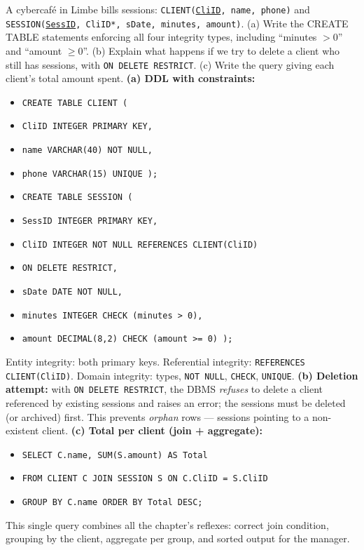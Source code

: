 \documentclass[11pt]{article}
\begin{document}
\begin{exoresolu}
A cybercafé in Limbe bills sessions: \texttt{CLIENT(\underline{CliID}, name, phone)} and \texttt{SESSION(\underline{SessID}, CliID*, sDate, minutes, amount)}. (a) Write the CREATE TABLE statements enforcing all four integrity types, including ``minutes $> 0$'' and ``amount $\geq 0$''. (b) Explain what happens if we try to delete a client who still has sessions, with \texttt{ON DELETE RESTRICT}. (c) Write the query giving each client's total amount spent.
\tcblower
\textbf{(a) DDL with constraints:}
\begin{itemize}
\item[] \texttt{CREATE TABLE CLIENT (}
\item[] \texttt{\quad CliID INTEGER PRIMARY KEY,}
\item[] \texttt{\quad name VARCHAR(40) NOT NULL,}
\item[] \texttt{\quad phone VARCHAR(15) UNIQUE );}
\end{itemize}
\begin{itemize}
\item[] \texttt{CREATE TABLE SESSION (}
\item[] \texttt{\quad SessID INTEGER PRIMARY KEY,}
\item[] \texttt{\quad CliID INTEGER NOT NULL REFERENCES CLIENT(CliID)}
\item[] \texttt{\quad\quad ON DELETE RESTRICT,}
\item[] \texttt{\quad sDate DATE NOT NULL,}
\item[] \texttt{\quad minutes INTEGER CHECK (minutes > 0),}
\item[] \texttt{\quad amount DECIMAL(8,2) CHECK (amount >= 0) );}
\end{itemize}
Entity integrity: both primary keys. Referential integrity: \texttt{REFERENCES CLIENT(CliID)}. Domain integrity: types, \texttt{NOT NULL}, \texttt{CHECK}, \texttt{UNIQUE}.
\textbf{(b) Deletion attempt:} with \texttt{ON DELETE RESTRICT}, the DBMS \emph{refuses} to delete a client referenced by existing sessions and raises an error; the sessions must be deleted (or archived) first. This prevents \emph{orphan} rows — sessions pointing to a non-existent client.
\textbf{(c) Total per client (join + aggregate):}
\begin{itemize}
\item[] \texttt{SELECT C.name, SUM(S.amount) AS Total}
\item[] \texttt{FROM CLIENT C JOIN SESSION S ON C.CliID = S.CliID}
\item[] \texttt{GROUP BY C.name ORDER BY Total DESC;}
\end{itemize}
This single query combines all the chapter's reflexes: correct join condition, grouping by the client, aggregate per group, and sorted output for the manager.
\end{exoresolu}
\end{document}
